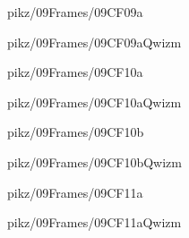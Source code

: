 \documentclass[9pt,xcolor={svgnames, x11names}]{beamer}
\begin{document}

\begin{frame}{pikz/09Frames/09CF09a}
  
\end{frame}


\begin{frame}{pikz/09Frames/09CF09aQwizm}
  
\end{frame}


\begin{frame}{pikz/09Frames/09CF10a}
  
\end{frame}


\begin{frame}{pikz/09Frames/09CF10aQwizm}
  
\end{frame}


\begin{frame}{pikz/09Frames/09CF10b}
  
\end{frame}

\begin{frame}{pikz/09Frames/09CF10bQwizm}
  
\end{frame}


\begin{frame}{pikz/09Frames/09CF11a}
  
\end{frame}

\begin{frame}{pikz/09Frames/09CF11aQwizm}
  
\end{frame}
\end{document}
